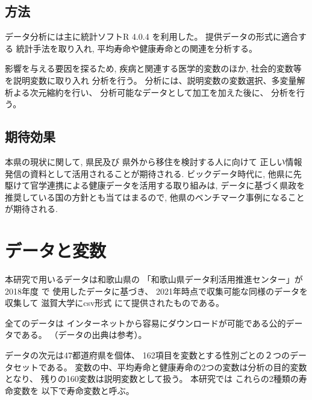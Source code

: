 \section{方法}
データ分析には主に統計ソフトR 4.0.4
を利用した。
提供データの形式に適合する
統計手法を取り入れ,
平均寿命や健康寿命との関連を分析する。

影響を与える要因を探るため,
疾病と関連する医学的変数のほか, 社会的変数等を説明変数に取り入れ
分析を行う。
分析には、説明変数の変数選択、多変量解析よる次元縮約を行い、
分析可能なデータとして加工を加えた後に、
分析を行う。




\section{期待効果}

本県の現状に関して,
県民及び
県外から移住を検討する人に向けて
正しい情報発信の資料として活用されることが期待される.
ビックデータ時代に, 他県に先駆けて官学連携による健康データを活用する取り組みは, データに基づく県政を推奨している国の方針とも当てはまるので, 他県のベンチマーク事例になることが期待される.




\chapter{データと変数}\label{chapter:data}

本研究で用いるデータは和歌山県の
「和歌山県データ利活用推進センター」が
2018年度
で
使用したデータに基づき、
2021年時点で収集可能な同様のデータを収集して
滋賀大学にcsv形式
にて提供されたものである。


全てのデータは
インターネットから容易にダウンロードが可能である公的データである。
（データの出典は参考）。



データの次元は47都道府県を個体、
162項目を変数とする性別ごとの２つのデータセットである。
変数の中、平均寿命と健康寿命の2つの変数は分析の目的変数となり、
残りの160変数は説明変数として扱う。
本研究では
これらの2種類の寿命変数を
以下で寿命変数と呼ぶ。

